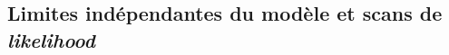 \subsection{Limites indépendantes du modèle et scans de \emph{likelihood}}\label{chapter-HTT_analysis-section-signal_extraction-model_indep_and_likelihood}


